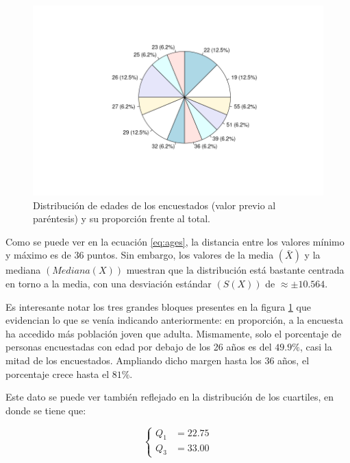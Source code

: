 \begin{figure}[H]
  \centering
  \includegraphics[width=\linewidth]{images/ages-pie.png}
  \caption{Distribución de edades de los encuestados (valor previo al paréntesis) y su proporción frente al total.}
  \label{fig:ages}
\end{figure}

Como se puede ver en la ecuación \ref{eq:ages}, la distancia entre los valores
mínimo y máximo es de $36$ puntos. Sin embargo, los valores de la media $\left(\bar{X}\right)$
y la mediana $\left(Mediana\left(X\right)\right)$ muestran que la distribución está
bastante centrada en torno a la media, con una desviación estándar $\left(S\left(X\right)\right)$
de $\approx\pm10.564$.

Es interesante notar los tres grandes bloques presentes en la figura \ref{fig:ages}
que evidencian lo que se venía indicando anteriormente: en proporción, a la encuesta
ha accedido más población joven que adulta. Mismamente, solo el porcentaje de personas
encuestadas con edad por debajo de los 26 años es del $49.9\%$, casi la mitad de
los encuestados. Ampliando dicho margen hasta los 36 años, el porcentaje crece hasta
el $81 \%$.

Este dato se puede ver también reflejado en la distribución de los cuartiles, en donde
se tiene que:

\begin{equation}\label{eq:age-quartiles}
  \left\{
  \begin{aligned}
    Q_1 & = 22.75 \\
    Q_3 & = 33.00
  \end{aligned}
  \right.
\end{equation}

